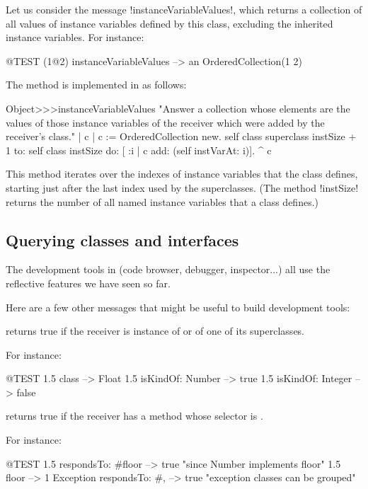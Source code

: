 \documentclass[a4paper,10pt,twoside]{book}
\begin{document}
Let us consider the message \ct!instanceVariableValues!, which returns a collection of all values of instance variables defined by this class, excluding the inherited instance variables.
For instance:
\begin{code}{@TEST}
(1@2) instanceVariableValues --> an OrderedCollection(1 2)
\end{code}

The method is implemented in  as follows:
\begin{code}{}
Object>>>instanceVariableValues
	"Answer a collection whose elements are the values of those instance variables of the receiver which were added by the receiver's class."	
	| c |
	c := OrderedCollection new.
	self class superclass instSize + 1
		to: self class instSize
		do: [ :i | c add: (self instVarAt: i)].
	^ c
\end{code}

This method iterates over the indexes of instance variables that the class defines, starting just after the last index used by the superclasses.
(The method \ct!instSize! returns the number of all named instance variables that a class defines.)

\subsection{Querying classes and interfaces}

The development tools in \squeak (code browser, debugger, inspector...) all use the reflective features we have seen so far.

Here are a few other messages that might be useful to build development tools:


 returns true if the receiver is instance of  or of one of its superclasses.

For instance:
\begin{code}{@TEST}
1.5 class                     --> Float
1.5 isKindOf: Number --> true
1.5 isKindOf: Integer   --> false
\end{code}


 returns true if the receiver has a method whose selector is .

For instance:
\begin{code}{@TEST}
1.5 respondsTo: #floor      --> true    "since Number implements floor"
1.5 floor                            --> 1
Exception respondsTo: #, --> true    "exception classes can be grouped"
\end{code}
\end{document}
